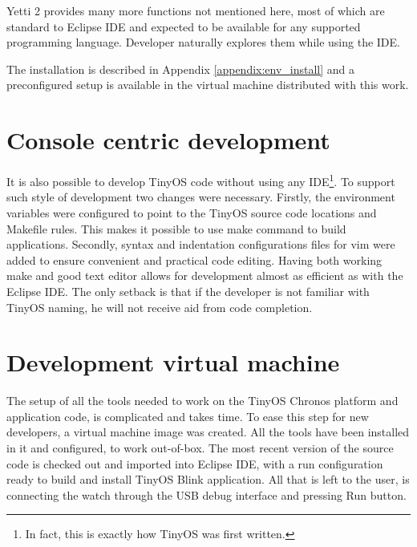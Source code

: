 Yetti 2 provides many more functions not mentioned here, most of which
are standard to Eclipse IDE and expected to be available for any
supported programming language. Developer naturally explores them
while using the IDE.

The installation is described in Appendix \ref{appendix:env_install}
and a preconfigured setup is available in the virtual machine
distributed with this work.

\section{Console centric development}

It is also possible to develop TinyOS code without using any
IDE\footnote{In fact, this is exactly how TinyOS was first written.}.
To support such style of development two changes were necessary.
Firstly, the environment variables were configured to point to the
TinyOS source code locations and Makefile rules. This makes it
possible to use make command to build applications. Secondly, syntax
and indentation configurations files for vim were added to ensure
convenient and practical code editing.  Having both working make and
good text editor allows for development almost as efficient as with
the Eclipse IDE. The only setback is that if the developer is not
familiar with TinyOS naming, he will not receive aid from code
completion.

\section{Development virtual machine}

The setup of all the tools needed to work on the TinyOS Chronos
platform and application code, is complicated and takes time. To ease
this step for new developers, a virtual machine image was created.
All the tools have been installed in it and configured, to work
out-of-box. The most recent version of the source code is checked out
and imported into Eclipse IDE, with a run configuration ready to build
and install TinyOS Blink application.  All that is left to the user,
is connecting the watch through the USB debug interface and pressing
Run button.

